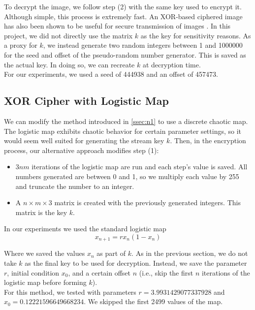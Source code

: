\documentclass[10pt]{article}
\begin{document}
    
    To decrypt the image, we follow step (2) with the same key used to encrypt it. Although simple, this process is extremely fast. An XOR-based ciphered image has also been shown to be useful for secure transmission of images \cite{Sharma}. In this project, we did not directly use the matrix $k$ as the key for sensitivity reasons. As a proxy for $k$, we instead generate two random integers between 1 and 1000000 for the seed and offset of the pseudo-random number generator. This is saved as the actual key. In doing so, we can recreate $k$ at decryption time.\\
    
    For our experiments, we used a seed of 444938 and an offset of 457473.
    
    \subsection{XOR Cipher with Logistic Map}
    
    We can modify the method introduced in \ref{ssec:n1} to use a discrete chaotic map. The logistic map exhibits chaotic behavior for certain parameter settings, so it would seem well suited for generating the stream key $k$. Then, in the encryption process, our alternative approach modifies step (1):
    
    \begin{itemize}
        \item $3nm$ iterations of the logistic map are run and each step's value is saved. All numbers generated are between 0 and 1, so we multiply each value by 255 and truncate the number to an integer.
        \item A $n\times m\times3$ matrix is created with the previously generated integers. This matrix is the key $k$.
    \end{itemize}

    In our experiments we used the standard logistic map
    $$x_{n+1} = r x_n(1-x_n)$$
    
    Where we saved the values $x_n$ as part of $k$. As in the previous section, we do not take $k$ as the final key to be used for decryption. Instead, we save the parameter $r$, initial condition $x_0$, and a certain offset $n$ (i.e., skip the first $n$ iterations of the logistic map before forming $k$).\\
    
    For this method, we tested with parameters $r=3.9931429077337928$ and $x_0 = 0.12221596649668234$. We skipped the first 2499 values of the map.
    
\end{document}
